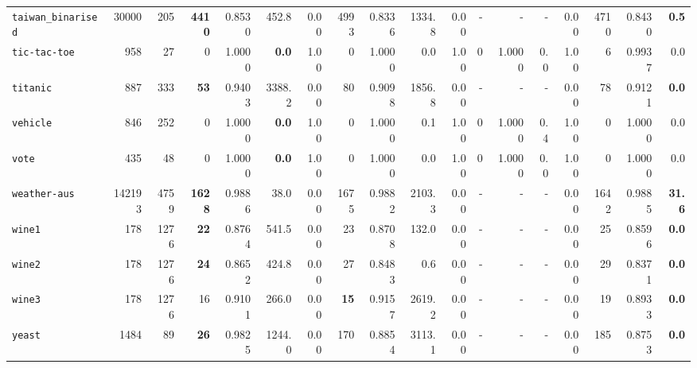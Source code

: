 \begin{tabular}{lccrrrrrrrrrrrrrrr}
\texttt{taiwan\_binarised} & \multicolumn{1}{r}{30000} & \multicolumn{1}{r}{205}  & \textbf{4410} & 0.8530 & 452.8 & 0.00 & 4993 & 0.8336 & 1334.8 & 0.00 & - & - & - & 0.00 & 4710 & 0.8430 & \textbf{0.5}\\
\texttt{tic-tac-toe} & \multicolumn{1}{r}{958} & \multicolumn{1}{r}{27}  & 0 & 1.0000 & \textbf{0.0} & 1.00 & 0 & 1.0000 & 0.0 & 1.00 & 0 & 1.0000 & 0.0 & 1.00 & 6 & 0.9937 & 0.0\\
\texttt{titanic} & \multicolumn{1}{r}{887} & \multicolumn{1}{r}{333}  & \textbf{53} & 0.9403 & 3388.2 & 0.00 & 80 & 0.9098 & 1856.8 & 0.00 & - & - & - & 0.00 & 78 & 0.9121 & \textbf{0.0}\\
\texttt{vehicle} & \multicolumn{1}{r}{846} & \multicolumn{1}{r}{252}  & 0 & 1.0000 & \textbf{0.0} & 1.00 & 0 & 1.0000 & 0.1 & 1.00 & 0 & 1.0000 & 0.4 & 1.00 & 0 & 1.0000 & 0.0\\
\texttt{vote} & \multicolumn{1}{r}{435} & \multicolumn{1}{r}{48}  & 0 & 1.0000 & \textbf{0.0} & 1.00 & 0 & 1.0000 & 0.0 & 1.00 & 0 & 1.0000 & 0.0 & 1.00 & 0 & 1.0000 & 0.0\\
\texttt{weather-aus} & \multicolumn{1}{r}{142193} & \multicolumn{1}{r}{4759}  & \textbf{1628} & 0.9886 & 38.0 & 0.00 & 1675 & 0.9882 & 2103.3 & 0.00 & - & - & - & 0.00 & 1642 & 0.9885 & \textbf{31.6}\\
\texttt{wine1} & \multicolumn{1}{r}{178} & \multicolumn{1}{r}{1276}  & \textbf{22} & 0.8764 & 541.5 & 0.00 & 23 & 0.8708 & 132.0 & 0.00 & - & - & - & 0.00 & 25 & 0.8596 & \textbf{0.0}\\
\texttt{wine2} & \multicolumn{1}{r}{178} & \multicolumn{1}{r}{1276}  & \textbf{24} & 0.8652 & 424.8 & 0.00 & 27 & 0.8483 & 0.6 & 0.00 & - & - & - & 0.00 & 29 & 0.8371 & \textbf{0.0}\\
\texttt{wine3} & \multicolumn{1}{r}{178} & \multicolumn{1}{r}{1276}  & 16 & 0.9101 & 266.0 & 0.00 & \textbf{15} & 0.9157 & 2619.2 & 0.00 & - & - & - & 0.00 & 19 & 0.8933 & \textbf{0.0}\\
\texttt{yeast} & \multicolumn{1}{r}{1484} & \multicolumn{1}{r}{89}  & \textbf{26} & 0.9825 & 1244.0 & 0.00 & 170 & 0.8854 & 3113.1 & 0.00 & - & - & - & 0.00 & 185 & 0.8753 & \textbf{0.0}\\
\bottomrule
\end{tabular}
